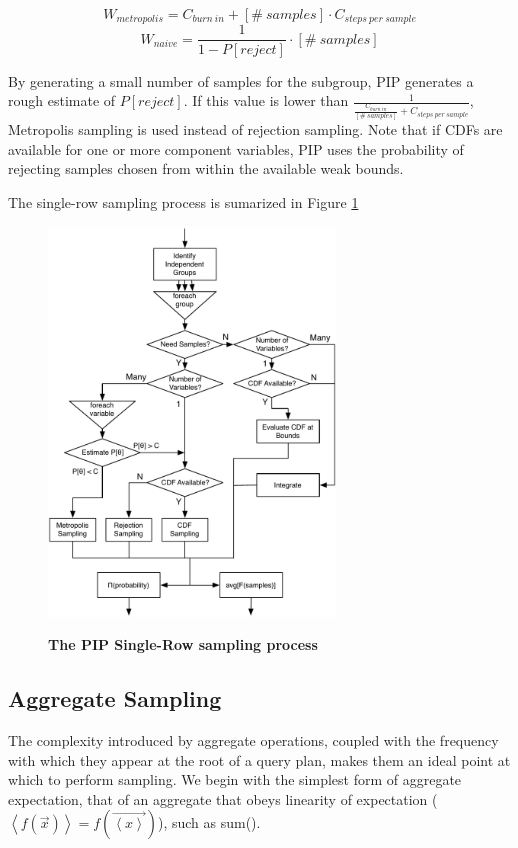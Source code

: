 $$W_{metropolis} = C_{burn\ in} + [\#\ samples] \cdot C_{steps\ per\ sample}$$
$$W_{naive} = \frac{1}{1-P[reject]} \cdot [\#\ samples]$$

By generating a small number of samples for the subgroup, PIP generates a rough estimate of $P[reject]$.  If this value is lower than $\frac{1}{\frac{C_{burn\ in}}{[\#\ samples]} + C_{steps\ per\ sample}}$, Metropolis sampling is used instead of rejection sampling.  Note that if CDFs are available for one or more component variables, PIP uses the probability of rejecting samples chosen from within the available weak bounds.

The single-row sampling process is sumarized in Figure \ref{fig:roadmap}

\begin{figure}
\begin{center}
\includegraphics[width=3in]{graphics/roadmap.pdf}
\caption{\textbf{The PIP Single-Row sampling process}}
\vspace*{-0.2in}
\label{fig:roadmap}
\end{center}
\vspace*{-0.15in}
\end{figure}

\subsection{Aggregate Sampling}
The complexity introduced by aggregate operations, coupled with the frequency with which they appear at the root of a query plan, makes them an ideal point at which to perform sampling.  We begin with the simplest form of aggregate expectation, that of an aggregate that obeys linearity of expectation ($\left<f(\vec{x})\right> = f(\vec{\left<x\right>})$), such as sum().  

